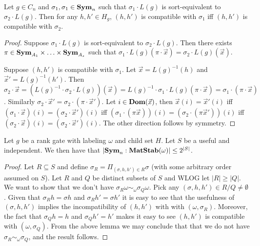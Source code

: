\documentclass[../paper.tex]{subfiles}
\begin{document}
\begin{lem}
  Let $g \in C_n$ and $\sigma_1, \sigma_1 \in \text{\textbf{Sym}}_n$ such that $\sigma_1 \cdot
  L(g)$ is sort-equivalent to $\sigma_2 \cdot L(g)$. Then for any $h,h' \in H_g$,
  $(h,h')$ is compatible with $\sigma_1$ iff $(h,h')$ is compatible with
  $\sigma_2$.
\end{lem}
\begin{proof}
  Suppose $\sigma_1 \cdot L(g)$ is sort-equivalent to $\sigma_2 \cdot L(g)$.
  Then there exists $\pi \in \text{\textbf{Sym}}_{A_1} \times \ldots \times \text{\textbf{Sym}}_{A_s}$ such
  that $\sigma_1 \cdot L(g) (\pi \cdot \vec{x}) = \sigma_2 \cdot L(g)
  (\vec{x})$.

  Suppose $(h, h')$ is compatible with $\sigma_1$. Let $\vec{x} = L(g)^{-1}(h)$
  and $\vec{x}' = L(g)^{-1}(h')$. Then $\sigma_2 \cdot \vec{x} = (L(g)^{-1}
  \cdot \sigma_2 \cdot L(g)) (\vec{x}) = L(g)^{-1} \cdot \sigma_1 \cdot L(g)(\pi
  \cdot \vec{x}) = \sigma_1 \cdot (\pi \cdot \vec{x})$. Similarly $\sigma_2
  \cdot \vec{x}' = \sigma_2 \cdot (\pi \cdot \vec{x}')$. Let $i \in \text{\textbf{Dom}}
  (\vec{x})$, then $\vec{x}(i) = \vec{x}'(i)$ iff $(\sigma_1 \cdot \vec{x})(i) =
  (\sigma_2 \cdot \vec{x}')(i)$ iff $(\sigma_1 \cdot (\pi \vec{x}))(i) =
  (\sigma_2 \cdot (\pi \vec{x}'))(i)$ iff $(\sigma_2 \cdot \vec{x})(i) =
  (\sigma_2 \cdot \vec{x}')(i)$. The other direction follows by symmetry.
\end{proof}

\begin{claim}
  \label{claim:useful-independant-set}
  Let $g$ be a rank gate with labeling $\omega$ and child set $H$. Let $S$ be a
  useful and independent. We then have that $\vert \text{\textbf{Sym}}_n: \text{\textbf{MatStab}}(\omega)
  \vert \leq 2^{\vert S \vert}$.
\end{claim}

\begin{proof}
  Let $R \subseteq S$ and define $\sigma_R = \Pi_{(\sigma, h, h') \in R} \sigma$
  (with some arbitrary order assumed on $S$). Let $R$ and $Q$ be distinct
  subsets of $S$ and WLOG let $\vert R \vert \geq \vert Q \vert$. We want to
  show that we don't have $\sigma_R \omega \sim_\omega \sigma_Q \omega$. Pick
  any $(\sigma, h, h') \in R/Q \neq \emptyset$. Given that $\sigma_R h = \sigma
  h$ and $\sigma_R h' = \sigma h'$ it is easy to see that the usefulness of
  $(\sigma, h,h')$ implies the incompatibility of $(h,h')$ with with $(\omega,
  \sigma_R)$. Moreover, the fact that $\sigma_Q h = h$ and $\sigma_Q h' = h'$
  makes it easy to see $(h,h')$ is compatible with $(\omega, \sigma_Q)$. From
  the above lemma we may conclude that that we do not have $\sigma_R \sim_\omega
  \sigma_Q$, and the result follows.
\end{proof}
\end{document}
